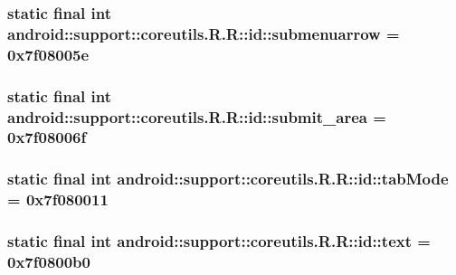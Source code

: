 \hypertarget{classandroid_1_1support_1_1coreutils_1_1_r_1_1id_8c3e2c0a51624dd19e16526778ffef92}{
\subsubsection[{submenuarrow}]{\setlength{\rightskip}{0pt plus 5cm}static final int android::support::coreutils.R.R::id::submenuarrow = 0x7f08005e}}
\label{classandroid_1_1support_1_1coreutils_1_1_r_1_1id_8c3e2c0a51624dd19e16526778ffef92}


\hypertarget{classandroid_1_1support_1_1coreutils_1_1_r_1_1id_513982858194f0aa5b9c8697cd153816}{
\subsubsection[{submit\_\-area}]{\setlength{\rightskip}{0pt plus 5cm}static final int android::support::coreutils.R.R::id::submit\_\-area = 0x7f08006f}}
\label{classandroid_1_1support_1_1coreutils_1_1_r_1_1id_513982858194f0aa5b9c8697cd153816}


\hypertarget{classandroid_1_1support_1_1coreutils_1_1_r_1_1id_bd3eb9bafadc464d8453fdf811c5f31b}{
\subsubsection[{tabMode}]{\setlength{\rightskip}{0pt plus 5cm}static final int android::support::coreutils.R.R::id::tabMode = 0x7f080011}}
\label{classandroid_1_1support_1_1coreutils_1_1_r_1_1id_bd3eb9bafadc464d8453fdf811c5f31b}


\hypertarget{classandroid_1_1support_1_1coreutils_1_1_r_1_1id_05bbd5b60b144e771fe39708444eb622}{
\subsubsection[{text}]{\setlength{\rightskip}{0pt plus 5cm}static final int android::support::coreutils.R.R::id::text = 0x7f0800b0}}
\label{classandroid_1_1support_1_1coreutils_1_1_r_1_1id_05bbd5b60b144e771fe39708444eb622}



